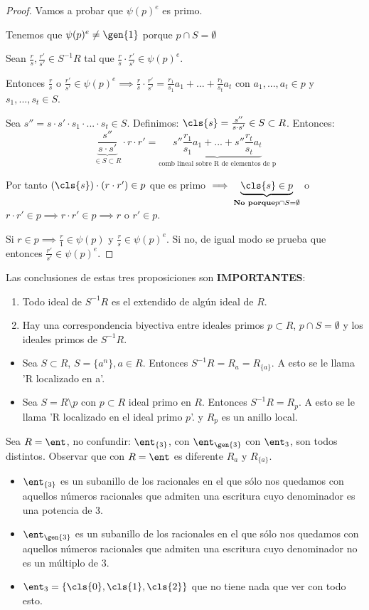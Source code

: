 \begin{proof}
	Vamos a probar que $\psi(p)^e$ es primo.
	
	Tenemos que $\psi(p)^e\neq \gen{1}$ porque $p \cap S= \emptyset$
	
	Sean $\frac{r}{s},\frac{r'}{s'} \in S^{-1}R$ tal que $\frac{r}{s}\cdot\frac{r'}{s'} \in \psi(p)^e$.
	
	Entonces $\frac{r}{s}$ o $\frac{r'}{s'} \in \psi(p)^e \implies \frac{r}{s}\cdot\frac{r'}{s'}=\frac{r_1}{s_1}a_1+...+\frac{r_t}{s_t}a_t$ con $a_1,...,a_t \in p$ y $s_1,...,s_t \in S$.
	
	Sea $s''=s\cdot s' \cdot s_1 \cdot...\cdot s_t \in S$. Definimos: $\cls{s}=\frac{s''}{s\cdot s'} \in S \subset R$. Entonces:
	$$ \underbrace{\frac{s''}{s\cdot s'}}_{\in S \subset R}\cdot r \cdot r'=\underbrace{s''\frac{r_1}{s_1}a_1+...+s''\frac{r_t}{s_t}a_t}_{\text{comb lineal sobre R de elementos de p}} $$
	
	Por tanto $(\cls{s})\cdot(r \cdot r') \in p$ que es primo $\implies \underbrace{\cls{s}\in p}_{\textbf{No porque}p\cap S = \emptyset}$ o $r\cdot r' \in p \implies r \cdot r' \in p \implies r$ o $r' \in p$.
	
	Si $r \in p \implies \frac{r}{1} \in \psi(p)$ y $\frac{r}{s} \in \psi(p)^e$. Si no, de igual modo se prueba que entonces $\frac{r'}{s'}\in \psi(p)^e$.
\end{proof}

Las conclusiones de estas tres proposiciones son \textbf{IMPORTANTES}:
\begin{enumerate}
	\item Todo ideal de $S^{-1}R$ es el extendido de algún ideal de $R$.
	\item Hay una correspondencia biyectiva entre ideales primos $p \subset R$, $p \cap S = \emptyset$ y los ideales primos de $S^{-1}R$.
\end{enumerate}

\notacion 
\begin{itemize}
	\item Sea $S \subset R$, $S=\{ a^n \}, a \in R$. Entonces $S^{-1}R=R_a=R_{\{a\}}$. A esto se le llama 'R localizado en a'.
	\item Sea $S=R \setminus p$ con $p \subset R$ ideal primo en $R$. Entonces $S^{-1}R=R_p$. A esto se le llama 'R localizado en el ideal primo $p$'. y $R_p$ es un anillo local.
\end{itemize}
Sea $R=\ent$, no confundir: $\ent_{\{3\}}$, con $\ent_{\gen{3}}$ con $\ent_3$, son todos distintos. Observar que con $R=\ent$ es diferente $R_a$ y $R_{\{a\}}$.
\begin{itemize}
	\item $\ent_{\{3\}}$ es un subanillo de los racionales en el que sólo nos quedamos con aquellos números racionales que admiten una escritura cuyo denominador es una potencia de 3.
	\item $\ent_{\gen{3}}$ es un subanillo de los racionales en el que sólo nos quedamos con aquellos números racionales que admiten una escritura cuyo denominador no es un múltiplo de 3.
	\item $\ent_3=\{ \cls{0},\cls{1},\cls{2} \}$ que no tiene nada que ver con todo esto. 
\end{itemize}


